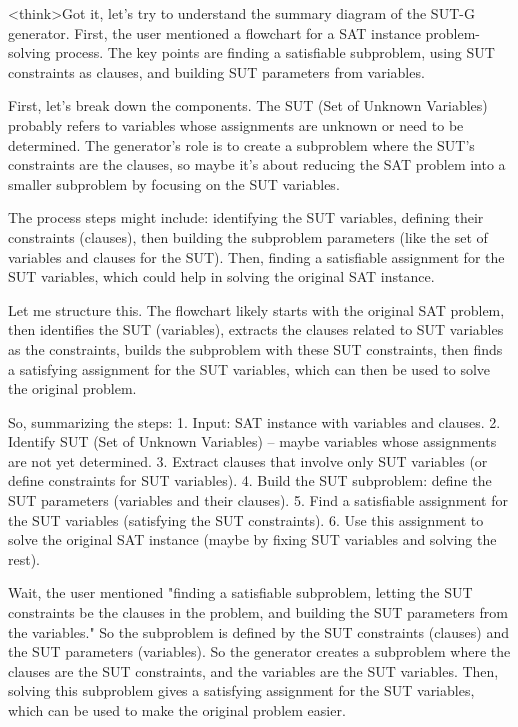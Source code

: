 <think>Got it, let's try to understand the summary diagram of the SUT-G generator. First, the user mentioned a flowchart for a SAT instance problem-solving process. The key points are finding a satisfiable subproblem, using SUT constraints as clauses, and building SUT parameters from variables. 

First, let's break down the components. The SUT (Set of Unknown Variables) probably refers to variables whose assignments are unknown or need to be determined. The generator's role is to create a subproblem where the SUT's constraints are the clauses, so maybe it's about reducing the SAT problem into a smaller subproblem by focusing on the SUT variables. 

The process steps might include: identifying the SUT variables, defining their constraints (clauses), then building the subproblem parameters (like the set of variables and clauses for the SUT). Then, finding a satisfiable assignment for the SUT variables, which could help in solving the original SAT instance. 

Let me structure this. The flowchart likely starts with the original SAT problem, then identifies the SUT (variables), extracts the clauses related to SUT variables as the constraints, builds the subproblem with these SUT constraints, then finds a satisfying assignment for the SUT variables, which can then be used to solve the original problem. 

So, summarizing the steps: 
1. Input: SAT instance with variables and clauses. 
2. Identify SUT (Set of Unknown Variables) – maybe variables whose assignments are not yet determined. 
3. Extract clauses that involve only SUT variables (or define constraints for SUT variables). 
4. Build the SUT subproblem: define the SUT parameters (variables and their clauses). 
5. Find a satisfiable assignment for the SUT variables (satisfying the SUT constraints). 
6. Use this assignment to solve the original SAT instance (maybe by fixing SUT variables and solving the rest). 

Wait, the user mentioned "finding a satisfiable subproblem, letting the SUT constraints be the clauses in the problem, and building the SUT parameters from the variables." So the subproblem is defined by the SUT constraints (clauses) and the SUT parameters (variables). So the generator creates a subproblem where the clauses are the SUT constraints, and the variables are the SUT variables. Then, solving this subproblem gives a satisfying assignment for the SUT variables, which can be used to make the original problem easier. 

